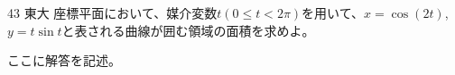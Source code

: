 \begin{prob}{43}{ \maru}{東大}
 座標平面において、媒介変数$t (0\le t< 2\pi)$を用いて、$x=\cos(2t)$, $y=t\sin t$と表される曲線が囲む領域の面積を求めよ。
\end{prob}
ここに解答を記述。